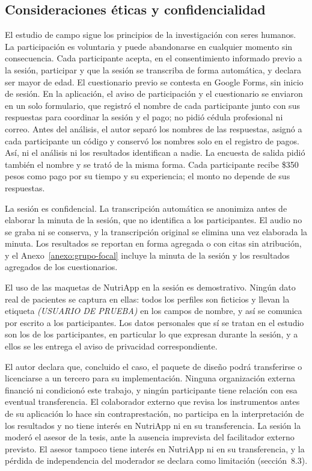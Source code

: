 \documentclass[12pt, a4paper]{article}
\begin{document}
\subsection{Consideraciones éticas y confidencialidad}
 
El estudio de campo sigue los principios de la investigación con seres
humanos. La participación es voluntaria y puede abandonarse en cualquier
momento sin consecuencia. Cada participante acepta, en el consentimiento
informado previo a la sesión, participar y que la sesión se transcriba
de forma automática, y declara ser mayor de edad. El cuestionario previo
se contesta en Google Forms, sin inicio de sesión. En la aplicación, el
aviso de participación y el cuestionario se enviaron en un solo
formulario, que registró el nombre de cada participante junto con sus
respuestas para coordinar la sesión y el pago; no pidió cédula
profesional ni correo. Antes del análisis, el autor separó los nombres
de las respuestas, asignó a cada participante un código y conservó los
nombres solo en el registro de pagos. Así, ni el análisis ni los
resultados identifican a nadie. La encuesta de salida pidió también el
nombre y se trató de la misma forma. Cada participante recibe \$350
pesos como pago por su tiempo y su experiencia; el monto no depende de
sus respuestas.

La sesión es confidencial. La transcripción automática se anonimiza
antes de elaborar la minuta de la sesión, que no identifica a los
participantes. El audio no se graba ni se conserva, y la transcripción
original se elimina una vez elaborada la minuta. Los resultados se
reportan en forma agregada o con citas sin atribución, y el
Anexo~\ref{anexo:grupo-focal} incluye la minuta de la sesión y los
resultados agregados de los cuestionarios.
 
El uso de las maquetas de NutriApp en la sesión es demostrativo.
Ningún dato real de pacientes se captura en ellas: todos los perfiles
son ficticios y llevan la etiqueta \textit{(USUARIO DE PRUEBA)} en los
campos de nombre, y así se comunica por escrito a los participantes.
Los datos personales que sí se tratan en el estudio son los de los
participantes, en particular lo que expresan durante la sesión, y a ellos se les
entrega el aviso de privacidad correspondiente.
 
El autor declara que, concluido el caso, el paquete de diseño podrá
transferirse o licenciarse a un tercero para su implementación.
Ninguna organización externa financió ni condicionó este trabajo, y
ningún participante tiene relación con esa eventual transferencia. El
colaborador externo que revisa los instrumentos antes de su aplicación lo hace
sin contraprestación, no participa en la interpretación de los
resultados y no tiene interés en NutriApp ni en su transferencia. La
sesión la moderó el asesor de la tesis, ante la ausencia imprevista del
facilitador externo previsto. El asesor tampoco tiene interés en
NutriApp ni en su transferencia, y la pérdida de independencia del
moderador se declara como limitación (sección~8.3).
\end{document}
